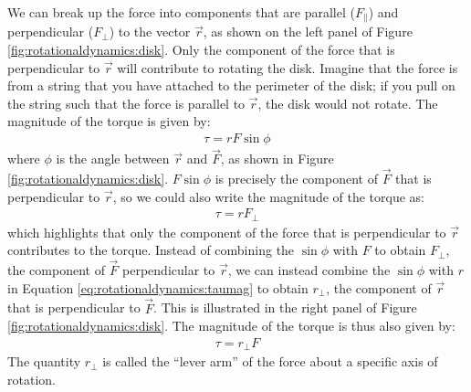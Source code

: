We can break up the force into components that are parallel ($F_\parallel$) and perpendicular ($F_\perp$) to the vector $\vec r$, as shown on the left panel of Figure \ref{fig:rotationaldynamics:disk}. Only the component of the force that is perpendicular to $\vec r$ will contribute to rotating the disk. Imagine that the force is from a string that you have attached to the perimeter of the disk; if you pull on the string such that the force is parallel to $\vec r$, the disk would not rotate. The magnitude of the torque is given by:
\begin{align}
\label{eq:rotationaldynamics:taumag}
\tau = rF\sin\phi
\end{align}
where $\phi$ is the angle between $\vec r$ and $\vec F$, as shown in Figure \ref{fig:rotationaldynamics:disk}. $F \sin \phi$ is precisely the component of $\vec F$ that is perpendicular to $\vec r$, so we could also write the magnitude of the torque as:
\begin{align*}
\tau =rF_\perp
\end{align*}
which highlights that only the component of the force that is perpendicular to $\vec r$ contributes to the torque. Instead of combining the $\sin \phi$ with $F$ to obtain $F_\perp$, the component of $\vec F$ perpendicular to $\vec r$, we can instead combine the $\sin \phi$ with $r$ in Equation \ref{eq:rotationaldynamics:taumag} to obtain $r_\perp$, the component of $\vec r$ that is perpendicular to $\vec F$. This is illustrated in the right panel of Figure \ref{fig:rotationaldynamics:disk}. The magnitude of the torque is thus also given by:
\begin{align*}
\tau =r_\perp F
\end{align*}
The quantity $r_\perp$ is called the ``lever arm'' of the force about a specific axis of rotation. 

